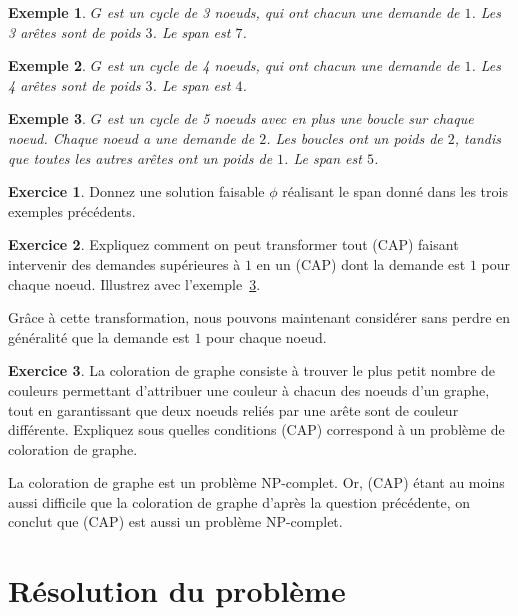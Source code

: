 \documentclass[a4paper,francais]{article}
\newtheorem{Exemple}{Exemple}
\theoremstyle{definition}
\newtheorem{exercice}{Exercice}[section]
\begin{document}
\begin{Exemple}
  \label{ex:triangle}
  $G$ est un cycle de 3 noeuds, qui ont chacun une demande de $1$.
  Les 3 arêtes sont de poids $3$. Le span est $7$.
\end{Exemple}

\begin{Exemple}
  \label{ex:carre}
  $G$ est un cycle de 4 noeuds, qui ont chacun une demande de $1$.
  Les 4 arêtes sont de poids $3$. Le span est $4$.
\end{Exemple}

\begin{Exemple}
  \label{ex:demande2}
  $G$ est un cycle de 5 noeuds avec en plus une boucle sur chaque noeud.
  Chaque noeud a une demande de $2$. Les boucles ont un poids de $2$,
  tandis que toutes les autres arêtes ont un poids de $1$. Le span est $5$. 
\end{Exemple}

\begin{exercice}
  Donnez une solution faisable $\phi$ réalisant le span donné
  dans les trois exemples précédents. 
\end{exercice}

\begin{exercice}
  Expliquez comment on peut transformer tout (CAP) faisant intervenir
  des demandes supérieures à $1$ en un (CAP) dont la demande est $1$
  pour chaque noeud. Illustrez avec l'exemple~\ref{ex:demande2}.
\end{exercice}

Grâce à cette transformation, nous pouvons maintenant considérer sans
perdre en généralité que la demande est $1$ pour chaque noeud.

\begin{exercice}
  La coloration de graphe consiste à trouver le plus petit nombre de
  couleurs permettant d'attribuer une couleur à chacun des noeuds
  d'un graphe, tout en garantissant que deux noeuds reliés par une
  arête sont de couleur différente.
  Expliquez sous quelles conditions (CAP) correspond à un problème
  de coloration de graphe. 
\end{exercice}

La coloration de graphe est un problème NP-complet. Or, (CAP) étant
au moins aussi difficile que la coloration de graphe d'après la
question précédente, on conclut que (CAP) est aussi un problème
NP-complet. 

\section{Résolution du problème}
\label{sec:resolution}
\end{document}
